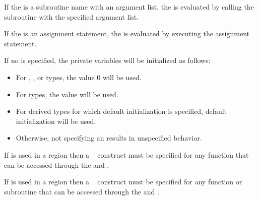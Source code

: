 \fortranspecificstart
If the  is a subroutine name with an argument list, the  is 
evaluated by calling the subroutine with the specified argument list.

If the  is an assignment statement, the  is evaluated by 
executing the assignment statement.

If no  is specified, the private variables will be initialized as follows:
\begin{itemize}
\item For , , or  types, the value 0 will be used.
\item For  types, the value  will be used.
\item For derived types for which default initialization is specified, default initialization 
will be used.
\item Otherwise, not specifying an  results in unspecified behavior.
\end{itemize}
\fortranspecificend
\bigskip

\ccppspecificstart
If  is used in a  region then a ~ construct 
must be specified for any function that can be accessed through the  and 
.
\ccppspecificend
\bigskip

\fortranspecificstart
If  is used in a  region then a ~ construct 
must be specified for any function or subroutine that can be accessed through the  
and .
\fortranspecificend

